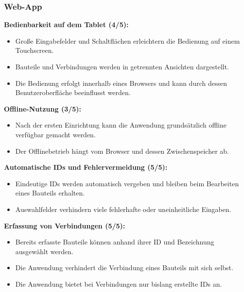 \newpage

\subsubsection{Web-App}

\textbf{Bedienbarkeit auf dem Tablet (4/5):}
\begin{itemize}[leftmargin=2em, nosep]
    \item[\pluspunkt] Große Eingabefelder und Schaltflächen erleichtern die
    Bedienung auf einem Touchscreen.
    \item[\pluspunkt] Bauteile und Verbindungen werden in getrennten
    Ansichten dargestellt.
    \item[\minuspunkt] Die Bedienung erfolgt innerhalb eines Browsers und
    kann durch dessen Benutzeroberfläche beeinflusst werden.
\end{itemize}

\medskip
\textbf{Offline-Nutzung (3/5):}
\begin{itemize}[leftmargin=2em, nosep]
    \item[\pluspunkt] Nach der ersten Einrichtung kann die Anwendung
    grundsätzlich offline verfügbar gemacht werden.
    \item[\minuspunkt] Der Offlinebetrieb hängt vom Browser und dessen
    Zwischenspeicher ab.
\end{itemize}

\medskip
\textbf{Automatische IDs und Fehlervermeidung (5/5):}
\begin{itemize}[leftmargin=2em, nosep]
    \item[\pluspunkt] Eindeutige IDs werden automatisch vergeben und bleiben
    beim Bearbeiten eines Bauteils erhalten.
    \item[\pluspunkt] Auswahlfelder verhindern viele fehlerhafte oder
    uneinheitliche Eingaben.
\end{itemize}

\medskip
\textbf{Erfassung von Verbindungen (5/5):}
\begin{itemize}[leftmargin=2em, nosep]
    \item[\pluspunkt] Bereits erfasste Bauteile können anhand ihrer ID und
    Bezeichnung ausgewählt werden.
    \item[\pluspunkt] Die Anwendung verhindert die Verbindung eines Bauteils
    mit sich selbst.
    \item[\pluspunkt] Die Anwendung bietet bei Verbindungen nur bislang erstellte IDs an.
\end{itemize}


